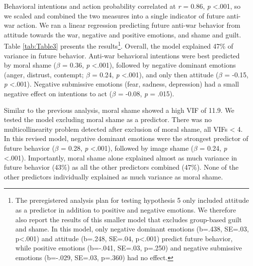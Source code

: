 \documentclass[
]{article}
\begin{document}
Behavioral intentions and action probability correlated at \emph{r} = 0.86, \emph{p} \textless.001, so we scaled and combined the two measures into a single indicator of future anti-war action. We ran a linear regression predicting future anti-war behavior from attitude towards the war, negative and positive emotions, and shame and guilt. Table \ref{tab:Table3} presents the results\footnote{The preregistered analysis plan for testing hypothesis 5 only included attitude as a predictor in addition to positive and negative emotions. We therefore also report the results of this smaller model that excludes group-based guilt and shame. In this model, only negative dominant emotions (b=.438, SE=.03, p\textless.001) and attitude (b=.248, SE=.04, p\textless.001) predict future behavior, while positive emotions (b=-.041, SE=.03, p=.250) and negative submissive emotions (b=-.029, SE=.03, p=.360) had no effect.}. Overall, the model explained 47\% of variance in future behavior. Anti-war behavioral intentions were best predicted by moral shame (\(\beta\) = 0.36, \emph{p} \textless.001), followed by negative dominant emotions (anger, distrust, contempt; \(\beta\) = 0.24, \emph{p} \textless.001), and only then attitude (\(\beta\) = -0.15, \emph{p} \textless.001). Negative submissive emotions (fear, sadness, depression) had a small negative effect on intentions to act (\(\beta\) = -0.08, \emph{p} = .015).

Similar to the previous analysis, moral shame showed a high VIF of 11.9. We tested the model excluding moral shame as a predictor. There was no multicollinearity problem detected after exclusion of moral shame, all VIFs \textless{} 4. In this revised model, negative dominant emotions were the strongest predictor of future behavior (\(\beta\) = 0.28, \emph{p} \textless.001), followed by image shame (\(\beta\) = 0.24, \emph{p} \textless.001). Importantly, moral shame alone explained almost as much variance in future behavior (43\%) as all the other predictors combined (47\%). None of the other predictors individually explained as much variance as moral shame.
\end{document}
